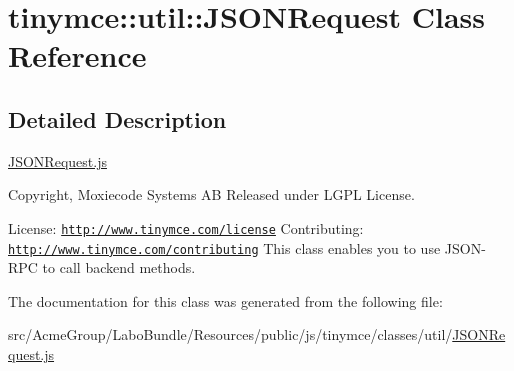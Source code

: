 \hypertarget{classtinymce_1_1util_1_1_j_s_o_n_request}{\section{tinymce\+:\+:util\+:\+:J\+S\+O\+N\+Request Class Reference}
\label{classtinymce_1_1util_1_1_j_s_o_n_request}
}


\subsection{Detailed Description}
\hyperlink{_j_s_o_n_request_8js}{J\+S\+O\+N\+Request.\+js}

Copyright, Moxiecode Systems A\+B Released under L\+G\+P\+L License.

License\+: \href{http://www.tinymce.com/license}{\tt http\+://www.\+tinymce.\+com/license} Contributing\+: \href{http://www.tinymce.com/contributing}{\tt http\+://www.\+tinymce.\+com/contributing} This class enables you to use J\+S\+O\+N-\/\+R\+P\+C to call backend methods. 

The documentation for this class was generated from the following file\+:\begin{DoxyCompactItemize}
\item 
src/\+Acme\+Group/\+Labo\+Bundle/\+Resources/public/js/tinymce/classes/util/\hyperlink{_j_s_o_n_request_8js}{J\+S\+O\+N\+Request.\+js}\end{DoxyCompactItemize}
